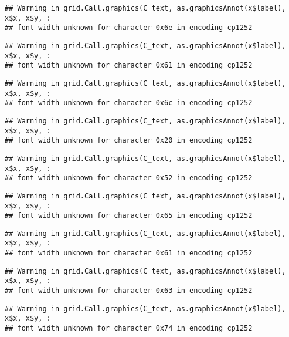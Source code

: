 \documentclass[
]{article}
\begin{document}
\begin{verbatim}
## Warning in grid.Call.graphics(C_text, as.graphicsAnnot(x$label), x$x, x$y, :
## font width unknown for character 0x6e in encoding cp1252
\end{verbatim}

\begin{verbatim}
## Warning in grid.Call.graphics(C_text, as.graphicsAnnot(x$label), x$x, x$y, :
## font width unknown for character 0x61 in encoding cp1252
\end{verbatim}

\begin{verbatim}
## Warning in grid.Call.graphics(C_text, as.graphicsAnnot(x$label), x$x, x$y, :
## font width unknown for character 0x6c in encoding cp1252
\end{verbatim}

\begin{verbatim}
## Warning in grid.Call.graphics(C_text, as.graphicsAnnot(x$label), x$x, x$y, :
## font width unknown for character 0x20 in encoding cp1252
\end{verbatim}

\begin{verbatim}
## Warning in grid.Call.graphics(C_text, as.graphicsAnnot(x$label), x$x, x$y, :
## font width unknown for character 0x52 in encoding cp1252
\end{verbatim}

\begin{verbatim}
## Warning in grid.Call.graphics(C_text, as.graphicsAnnot(x$label), x$x, x$y, :
## font width unknown for character 0x65 in encoding cp1252
\end{verbatim}

\begin{verbatim}
## Warning in grid.Call.graphics(C_text, as.graphicsAnnot(x$label), x$x, x$y, :
## font width unknown for character 0x61 in encoding cp1252
\end{verbatim}

\begin{verbatim}
## Warning in grid.Call.graphics(C_text, as.graphicsAnnot(x$label), x$x, x$y, :
## font width unknown for character 0x63 in encoding cp1252
\end{verbatim}

\begin{verbatim}
## Warning in grid.Call.graphics(C_text, as.graphicsAnnot(x$label), x$x, x$y, :
## font width unknown for character 0x74 in encoding cp1252
\end{verbatim}
\end{document}
